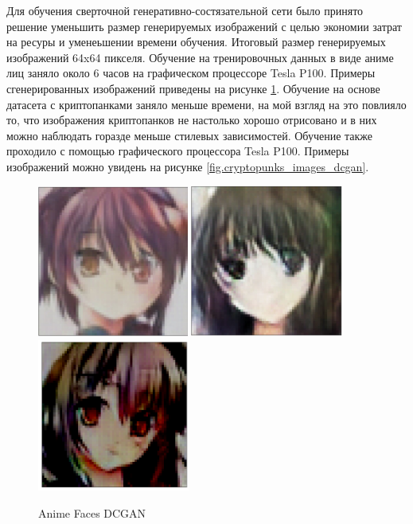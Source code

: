 Для обучения сверточной генеративно-состязательной сети было принято решение уменьшить размер генерируемых изображений с целью экономии затрат на ресуры и уменеьшении времени обучения. Итоговый размер генерируемых изображений 64x64 пикселя. Обучение на тренировочных данных в виде аниме лиц заняло около 6 часов на графическом процессоре Tesla P100. Примеры сгенерированных изображений приведены на рисунке {\color{blue} \ref{fig.anime_girls_dcgan}}.
Обучение на основе датасета с криптопанками заняло меньше времени, на мой взгляд на это повлияло то, что изображения криптопанков не настолько хорошо отрисовано и в них можно наблюдать горазде меньше стилевых зависимостей. Обучение также проходило с помощью графического процессора Tesla P100. Примеры изображений можно увидень на рисунке {\color{blue} \ref{fig.cryptopunks_images_dcgan}}.
\begin{figure}
    \centering
    \includegraphics[height=50mm, width=.3\textwidth]{fig/anime_girl_1_example_dcgan.png}\hfill
    \includegraphics[height=50mm, width=.3\textwidth]{fig/anime_girl_2_example_dcgan.png}\hfill
    \includegraphics[height=50mm, width=.3\textwidth]{fig/anime_girl_3_example_dcgan.png}
    \caption{Anime Faces DCGAN}
    \label{fig.anime_girls_dcgan}
\end{figure}

